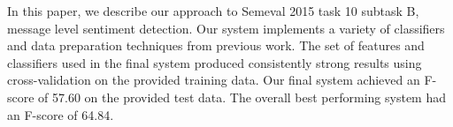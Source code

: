 In this paper, we describe our approach to Semeval 2015 task 10 subtask B, message level sentiment detection. Our system implements a variety of classifiers and data preparation techniques from previous work. The set of features and classifiers used in the final system produced consistently strong results using cross-validation on the provided training data. Our final system achieved an F-score of 57.60 on the provided test data. The overall best performing system had an F-score of 64.84.
